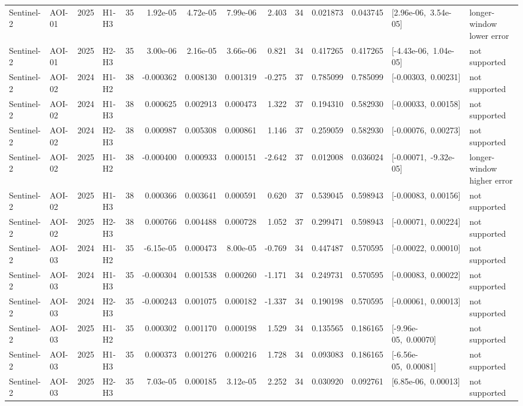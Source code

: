 \begin{landscape}
\begin{longtable}{llclrrrrrrrrp{2.35cm}p{1.75cm}}
Sentinel-2 & AOI-01 & 2025 & H1-H3 & 35 & 1.92e-05 & 4.72e-05 & 7.99e-06 & 2.403 & 34 & 0.021873 & 0.043745 & \mbox{[2.96e-06, 3.54e-05]} & longer-window lower error \\
Sentinel-2 & AOI-01 & 2025 & H2-H3 & 35 & 3.00e-06 & 2.16e-05 & 3.66e-06 & 0.821 & 34 & 0.417265 & 0.417265 & \mbox{[-4.43e-06, 1.04e-05]} & not supported \\
Sentinel-2 & AOI-02 & 2024 & H1-H2 & 38 & -0.000362 & 0.008130 & 0.001319 & -0.275 & 37 & 0.785099 & 0.785099 & \mbox{[-0.00303, 0.00231]} & not supported \\
Sentinel-2 & AOI-02 & 2024 & H1-H3 & 38 & 0.000625 & 0.002913 & 0.000473 & 1.322 & 37 & 0.194310 & 0.582930 & \mbox{[-0.00033, 0.00158]} & not supported \\
Sentinel-2 & AOI-02 & 2024 & H2-H3 & 38 & 0.000987 & 0.005308 & 0.000861 & 1.146 & 37 & 0.259059 & 0.582930 & \mbox{[-0.00076, 0.00273]} & not supported \\
Sentinel-2 & AOI-02 & 2025 & H1-H2 & 38 & -0.000400 & 0.000933 & 0.000151 & -2.642 & 37 & 0.012008 & 0.036024 & \mbox{[-0.00071, -9.32e-05]} & longer-window higher error \\
Sentinel-2 & AOI-02 & 2025 & H1-H3 & 38 & 0.000366 & 0.003641 & 0.000591 & 0.620 & 37 & 0.539045 & 0.598943 & \mbox{[-0.00083, 0.00156]} & not supported \\
Sentinel-2 & AOI-02 & 2025 & H2-H3 & 38 & 0.000766 & 0.004488 & 0.000728 & 1.052 & 37 & 0.299471 & 0.598943 & \mbox{[-0.00071, 0.00224]} & not supported \\
Sentinel-2 & AOI-03 & 2024 & H1-H2 & 35 & -6.15e-05 & 0.000473 & 8.00e-05 & -0.769 & 34 & 0.447487 & 0.570595 & \mbox{[-0.00022, 0.00010]} & not supported \\
Sentinel-2 & AOI-03 & 2024 & H1-H3 & 35 & -0.000304 & 0.001538 & 0.000260 & -1.171 & 34 & 0.249731 & 0.570595 & \mbox{[-0.00083, 0.00022]} & not supported \\
Sentinel-2 & AOI-03 & 2024 & H2-H3 & 35 & -0.000243 & 0.001075 & 0.000182 & -1.337 & 34 & 0.190198 & 0.570595 & \mbox{[-0.00061, 0.00013]} & not supported \\
Sentinel-2 & AOI-03 & 2025 & H1-H2 & 35 & 0.000302 & 0.001170 & 0.000198 & 1.529 & 34 & 0.135565 & 0.186165 & \mbox{[-9.96e-05, 0.00070]} & not supported \\
Sentinel-2 & AOI-03 & 2025 & H1-H3 & 35 & 0.000373 & 0.001276 & 0.000216 & 1.728 & 34 & 0.093083 & 0.186165 & \mbox{[-6.56e-05, 0.00081]} & not supported \\
Sentinel-2 & AOI-03 & 2025 & H2-H3 & 35 & 7.03e-05 & 0.000185 & 3.12e-05 & 2.252 & 34 & 0.030920 & 0.092761 & \mbox{[6.85e-06, 0.00013]} & not supported \\
\end{longtable}
\end{landscape}
